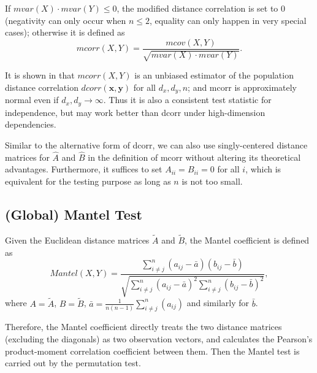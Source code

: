 \documentclass[11pt]{article}
\providecommand{\mb}[1]{\boldsymbol{#1}}
\begin{document}
If $mvar(X) \cdot mvar(Y) \leq 0$, the modified distance correlation is set to $0$ (negativity can only occur when $n\leq 2$, equality can only happen in very special cases); otherwise it is defined as
\begin{equation}
\label{mcorrEqu}
mcorr(X,Y)=\frac{mcov(X,Y)}{\sqrt{mvar(X) \cdot mvar(Y)}}.
\end{equation}

It is shown in \cite{SzekelyRizzo2013a} that $mcorr(X,Y)$ is an unbiased estimator of the population distance correlation $dcorr(\mb{x},\mb{y})$ for all $d_{x}, d_{y}, n$; and mcorr is approximately normal even if $d_{x},d_{y} \rightarrow \infty$. Thus it is also a consistent test statistic for independence, but may work better than dcorr under high-dimension dependencies. 

Similar to the alternative form of dcorr, we can also use singly-centered distance matrices for $\hat{A}$ and $\hat{B}$ in the definition of mcorr without altering its theoretical advantages. Furthermore, it suffices to set $A_{ii}=B_{ii}=0$ for all $i$, which is equivalent for the testing purpose as long as $n$ is not too small. %

\subsection{(Global) Mantel Test}
\label{appen:mantel}
Given the Euclidean distance matrices $\tilde{A}$ and $\tilde{B}$, the Mantel coefficient \cite{Mantel1967} is defined as 
\begin{equation}
Mantel(X,Y)=\frac{\sum_{i \neq j}^{n}(a_{ij}-\bar{a})(b_{ij}-\bar{b})}{\sqrt{\sum_{i \neq j}^{n}(a_{ij}-\bar{a})^2 \sum_{i \neq j}^{n}(b_{ij}-\bar{b})^2}},
\end{equation}
where $A=\tilde{A}$, $B=\tilde{B}$, $\bar{a}=\frac{1}{n(n-1)}\sum_{i \neq j}^{n}(a_{ij})$ and similarly for $\bar{b}$. 

Therefore, the Mantel coefficient directly treats the two distance matrices (excluding the diagonals) as two observation vectors, and calculates the Pearson's product-moment correlation coefficient between them. Then the Mantel test is carried out by the permutation test.
\end{document}
